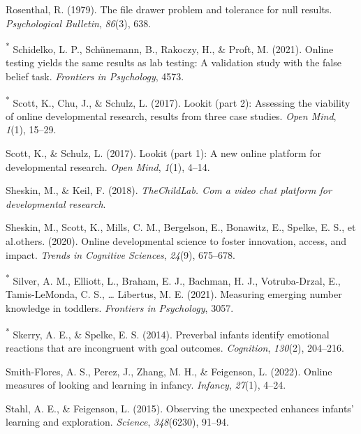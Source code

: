 \documentclass[
  man,floatsintext]{apa6}
\newlength{\cslhangindent}
\newlength{\cslentryspacingunit} %
\newenvironment{CSLReferences}[2] %
 {%
  \setlength{\parindent}{0pt}
  \ifodd #1
  \let\oldpar\par
  \def\par{\hangindent=\cslhangindent\oldpar}
  \fi
  \setlength{\parskip}{#2\cslentryspacingunit}
 }%
 {}
\begin{document}
\begin{CSLReferences}{1}{0}
\leavevmode{}%
Rosenthal, R. (1979). The file drawer problem and tolerance for null results. \emph{Psychological Bulletin}, \emph{86}(3), 638.

\leavevmode{}%
\textsuperscript{*} Schidelko, L. P., Schünemann, B., Rakoczy, H., \& Proft, M. (2021). Online testing yields the same results as lab testing: A validation study with the false belief task. \emph{Frontiers in Psychology}, 4573.

\leavevmode{}%
\textsuperscript{*} Scott, K., Chu, J., \& Schulz, L. (2017). Lookit (part 2): Assessing the viability of online developmental research, results from three case studies. \emph{Open Mind}, \emph{1}(1), 15--29.

\leavevmode{}%
Scott, K., \& Schulz, L. (2017). Lookit (part 1): A new online platform for developmental research. \emph{Open Mind}, \emph{1}(1), 4--14.

\leavevmode{}%
Sheskin, M., \& Keil, F. (2018). \emph{TheChildLab. Com a video chat platform for developmental research}.

\leavevmode{}%
Sheskin, M., Scott, K., Mills, C. M., Bergelson, E., Bonawitz, E., Spelke, E. S., et al.others. (2020). Online developmental science to foster innovation, access, and impact. \emph{Trends in Cognitive Sciences}, \emph{24}(9), 675--678.

\leavevmode{}%
\textsuperscript{*} Silver, A. M., Elliott, L., Braham, E. J., Bachman, H. J., Votruba-Drzal, E., Tamis-LeMonda, C. S., \ldots{} Libertus, M. E. (2021). Measuring emerging number knowledge in toddlers. \emph{Frontiers in Psychology}, 3057.

\leavevmode{}%
\textsuperscript{*} Skerry, A. E., \& Spelke, E. S. (2014). Preverbal infants identify emotional reactions that are incongruent with goal outcomes. \emph{Cognition}, \emph{130}(2), 204--216.

\leavevmode{}%
Smith-Flores, A. S., Perez, J., Zhang, M. H., \& Feigenson, L. (2022). Online measures of looking and learning in infancy. \emph{Infancy}, \emph{27}(1), 4--24.

\leavevmode{}%
Stahl, A. E., \& Feigenson, L. (2015). Observing the unexpected enhances infants' learning and exploration. \emph{Science}, \emph{348}(6230), 91--94.


\end{CSLReferences}
\end{document}
